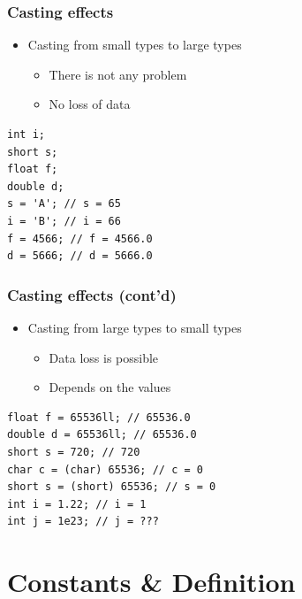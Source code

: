 \documentclass{../c-lecture}
\begin{document}
\begin{frame}[fragile]
  \frametitle{Casting effects}
  \begin{itemize}
    \item Casting from small types to large types
    \begin{itemize}
      \item There is not any problem
      \item No loss of data
    \end{itemize}
  \end{itemize}
  \begin{verbatim}
int i;
short s;
float f;
double d;
s = 'A'; // s = 65
i = 'B'; // i = 66
f = 4566; // f = 4566.0
d = 5666; // d = 5666.0
  \end{verbatim}
\end{frame}

\begin{frame}[fragile]
  \frametitle{Casting effects (cont’d)}
  \begin{itemize}
    \item Casting from large types to small types
    \begin{itemize}
      \item Data loss is possible
      \item Depends on the values
    \end{itemize}
  \end{itemize}
  \begin{verbatim}
float f = 65536ll; // 65536.0
double d = 65536ll; // 65536.0
short s = 720; // 720
char c = (char) 65536; // c = 0
short s = (short) 65536; // s = 0
int i = 1.22; // i = 1
int j = 1e23; // j = ???
  \end{verbatim}
\end{frame}

\section{Constants \& Definition}
\end{document}
